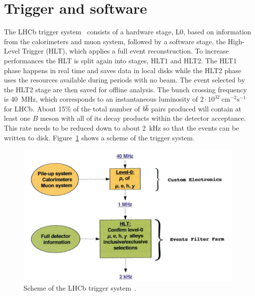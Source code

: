 \section{Trigger and software}
\label{sec:det_trigger}

The LHCb trigger system~\cite{LHCb-DP-2012-004} consists of a hardware stage, L0, based on information
from the calorimeters and muon system, followed by a software stage, the High-Level Trigger (HLT), which applies 
a full event reconstruction. To increase performances the HLT is split again into stages, HLT1 and HLT2. The 
HLT1 phase happens in real time and saves data in local disks while the HLT2 phase uses the resources
available during periods with no beam. The event selected by the HLT2 stage are then saved for offline analysis. 
The bunch crossing frequency is 40~$\mbox{MHz}$, which corresponds to an instantaneous luminosity of 
$2 \cdot 10^{32} ~\mbox{cm}^{-2} \mbox{s}^{-1}$ for LHCb. About 15\% of the total number of
$b\overline {b}$ pairs produced will contain at least one $B$ meson with all of its decay products 
within the detector acceptance. This rate needs to be reduced down to about 2~kHz so that the events can be 
written to disk. Figure~\ref{fig:triggerscheme} shows a scheme of the trigger system.
%
\begin{figure}[h!]
\centering 
\includegraphics[width=0.9\linewidth]{Detector/figs/triggerscheme.png}
\caption{Scheme of the LHCb trigger system~\cite{Alves:2008zz}.}
\label{fig:triggerscheme}
\end{figure}

